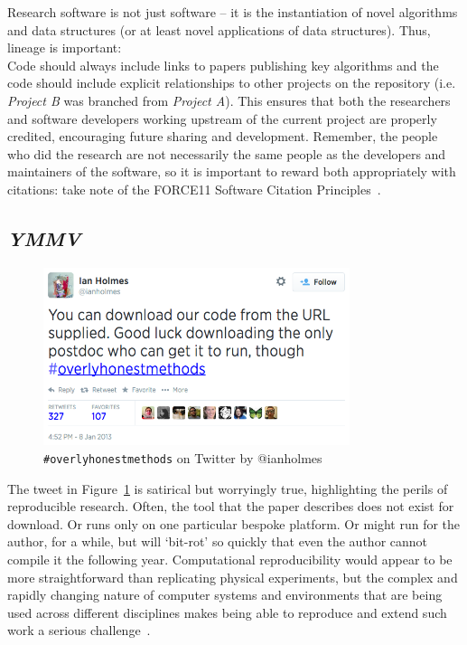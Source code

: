 \documentclass[a4paper,11pt]{article}
\begin{document}
Research software is not just software -- it is the instantiation of
novel algorithms and data structures (or at least novel applications
of data structures). Thus, lineage is important:\\

 Code should always
include links to papers publishing key algorithms and the code should
include explicit relationships to other projects on the repository
(i.e. {\emph{Project B}} was branched from {\emph{Project A}}). This
ensures that both the researchers and software developers working
upstream of the current project are properly credited, encouraging
future sharing and development. Remember, the people who did the
research are not necessarily the same people as the developers and
maintainers of the software, so it is important to reward both
appropriately with citations: take note of the FORCE11 Software
Citation Principles~\cite{smith-et-al:2016}.

\subsection{{\emph{YMMV}}}

\begin{figure}[!ht]
\centering
\includegraphics[width=0.8\textwidth]{images/overlyhonesttweet.png}
\caption{{\texttt{\#overlyhonestmethods}} on Twitter by @ianholmes}
\label{fig:overlyhonestmethod} 
\end{figure}

The tweet in Figure~\ref{fig:overlyhonestmethod} is satirical but
worryingly true, highlighting the perils of reproducible
research. Often, the tool that the paper describes does not exist for
download. Or runs only on one particular bespoke platform. Or might
run for the author, for a while, but will `bit-rot' so quickly that
even the author cannot compile it the following year. Computational
reproducibility would appear to be more straightforward than
replicating physical experiments, but the complex and rapidly changing
nature of computer systems and environments that are being used across
different disciplines makes being able to reproduce and extend such
work a serious challenge~\cite{boettiger:2015}.\\
\end{document}
